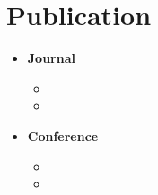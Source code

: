 \chapter*{Publication}

\begin{itemize}[label={}, leftmargin=*, itemsep=0pt]
    \item \textbf{Journal}
        \begin{itemize}[label=$\bullet$, leftmargin=*, itemsep=0pt]
            \item 
            \item 
        \end{itemize}
    \item \textbf{Conference}
        \begin{itemize}[label=$\bullet$, leftmargin=*, itemsep=0pt]
            \item 
            \item 
        \end{itemize}
\end{itemize}
